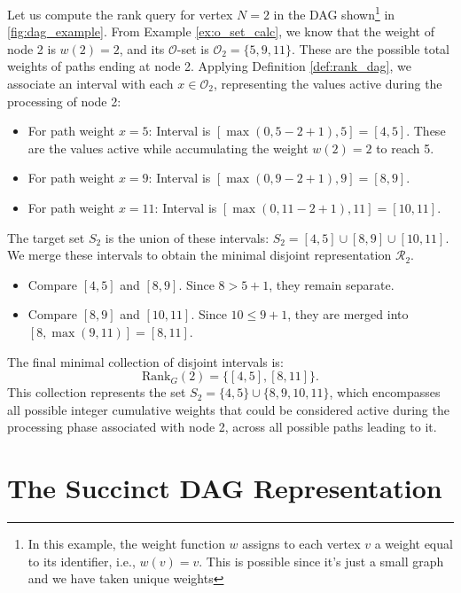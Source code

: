 \begin{example}
    \label{ex:rank_calc_disjoint}
    Let us compute the rank query for vertex $N=2$ in the DAG shown\footnote{In this example, the weight function $w$ assigns to each vertex $v$ a weight equal to its identifier, i.e., $w(v)=v$. This is possible since it's just a small graph and we have taken unique weights} in \autoref{fig:dag_example}. From Example \ref{ex:o_set_calc}, we know that the weight of node 2 is $w(2) = 2$, and its $\mathcal{O}$-set is $\mathcal{O}_2 = \{ 5, 9, 11 \}$. These are the possible total weights of paths ending at node 2.
    Applying Definition \ref{def:rank_dag}, we associate an interval with each $x \in \mathcal{O}_2$, representing the values active during the processing of node 2:
    \begin{itemize}
        \item For path weight $x=5$: Interval is $[\max(0, 5 - 2 + 1), 5] = [4, 5]$. These are the values active while accumulating the weight $w(2)=2$ to reach 5.
        \item For path weight $x=9$: Interval is $[\max(0, 9 - 2 + 1), 9] = [8, 9]$.
        \item For path weight $x=11$: Interval is $[\max(0, 11 - 2 + 1), 11] = [10, 11]$.
    \end{itemize}
    The target set $S_2$ is the union of these intervals: $S_2 = [4, 5] \cup [8, 9] \cup [10, 11]$.
    We merge these intervals to obtain the minimal disjoint representation $\mathcal{R}_2$.
    \begin{itemize}
        \item Compare $[4, 5]$ and $[8, 9]$. Since $8 > 5 + 1$, they remain separate.
        \item Compare $[8, 9]$ and $[10, 11]$. Since $10 \le 9 + 1$, they are merged into $[8, \max(9, 11)] = [8, 11]$.
    \end{itemize}
    The final minimal collection of disjoint intervals is:
    \[ \mathrm{Rank}_G(2) = \{ [4, 5], [8, 11] \}. \]
    This collection represents the set $S_2 = \{4, 5\} \cup \{8, 9, 10, 11\}$, which encompasses all possible integer cumulative weights that could be considered active during the processing phase associated with node 2, across all possible paths leading to it.
\end{example}

\section{The Succinct DAG Representation}
\label{sec:succinct_dag_representation}

